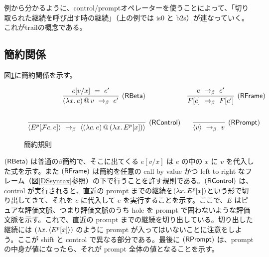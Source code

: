 例から分かるように、control/promptオペレーターを使うことによって、「切り取られた継続を呼び出す時の継続」（上の例では \textsf{is0} と \textsf{b2s}）が連なっていく。これがtrailの概念である。

\subsection{簡約関係}
図\ref{reduction}に簡約関係を示す。
\begin{figure}[h]
\[
  \begin{array}{cc}
    \infer[\RBeta]{\App{\LamP{x}{e}}{v}\ \rightarrow_{\beta}\ e'}
                  {e[\Change{x}{v}]\ =\ e'}
  & \infer[\RFrame]{F[e]\ \rightarrow_{\beta}\ F[e']}
                   {e\ \rightarrow_{\beta}\ e'}\\
\\[3mm]
    \infer[\RControl]{\Prompt{E^p[\Control{c}{e}]}\ \rightarrow_{\beta}\ \Prompt{\App{\LamP{c}{e}}{\LamP{x}{E^p[x]}}}}{}
  & \infer[\RPrompt]{\Prompt{v}\ \rightarrow_{\beta}\ v}{} 
          

  \end{array}
\]
\caption{簡約規則}
\label{reduction}
\end{figure}

$(\textsf{RBeta})$ は普通の$\beta$簡約で、そこに出てくる $e[v/x]$ は $e$ の中の $x$ に $v$ を代入した式を示す。また $(\textsf{RFrame})$ は簡約を任意の call by value かつ left to right なフレーム（図\ref{DSsyntax}参照）の下で行うことを許す規則である。$(\textsf{RControl})$ は、control が実行されると、直近の prompt までの継続を$(\lambda{x}.\,{E^p[x]})$という形で切り出してきて、それを $c$ に代入して $e$ を実行することを示す。ここで、$E$ はピュアな評価文脈、つまり評価文脈のうち hole を
prompt で囲わないような評価文脈を示す。これで、直近の prompt までの継続を切り出している。切り出した継続には $(\lambda{x}.\,{\langle E^p[x] \rangle})$ のように prompt が入ってはいないことに注意をしよう。ここが shift と control で異なる部分である。最後に $(\textsf{RPrompt})$ は、prompt の中身が値になったら、それが prompt 全体の値となることを示す。

